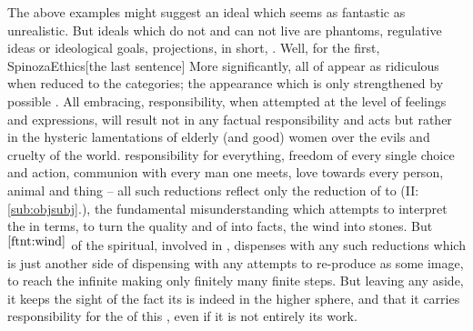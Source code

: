 \pa The above examples might suggest an ideal which seems as fantastic as
unrealistic. But ideals which do not and can not live are 
phantoms, regulative ideas or ideological goals,  projections, in
short, .  Well, for the first, \citet{[a]ll things excellent are as
  difficult as they are rare.}{SpinozaEthics}{[the last sentence]} More
significantly, all  of  appear as
ridiculous when reduced to the  categories; the appearance which is
only strengthened by possible .  All embracing, 
responsibility, when attempted at the level of  feelings and
expressions, will result not in any factual responsibility and acts but rather
in the hysteric lamentations of elderly (and good) women over the evils and
cruelty of the world.   responsibility for everything, 
freedom of every single choice and action,  communion with every man
one meets,  love towards every person, animal and thing -- all such
reductions reflect only the reduction of  to 
(II:\ref{sub:objsubj}.), the fundamental misunderstanding which
attempts to interpret the  in  terms, to turn the
quality and  of  into facts, the wind into stones. But
$^{\ref{ftnt:wind}}$
 of the spiritual, involved in ,
dispenses with any such reductions which is just another side of dispensing with
any attempts to re-produce  as some  image, to reach
the infinite making only finitely many finite steps. But leaving any 
aside, it keeps the  sight of the fact  its  is
indeed  in the higher sphere, and that it carries responsibility for
the  of this , even if it is not entirely its
work.

